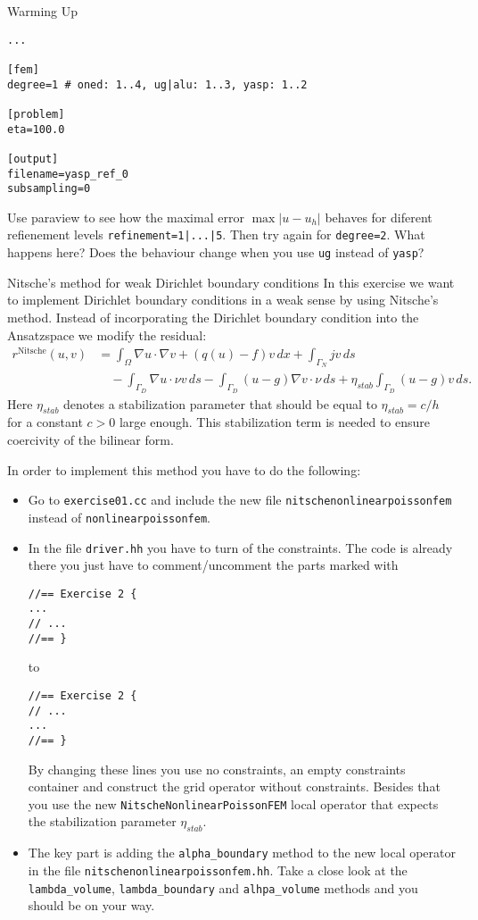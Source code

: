 \documentclass[12pt,a4paper]{article}
\begin{document}
\begin{Exercise}{Warming Up}
\begin{enumerate}
\begin{lstlisting}
...

[fem]
degree=1 # oned: 1..4, ug|alu: 1..3, yasp: 1..2

[problem]
eta=100.0

[output]
filename=yasp_ref_0
subsampling=0
    \end{lstlisting}
    Use paraview to see how the maximal error $\max|u-u_h|$ behaves
    for diferent refienement levels \lstinline{refinement=1|...|5}.
    Then try again for \lstinline{degree=2}.  What happens here?  Does
    the behaviour change when you use \lstinline{ug} instead of
    \lstinline{yasp}?
  \end{enumerate}
\end{Exercise}

\begin{Exercise}{Nitsche's method for weak Dirichlet boundary
    conditions}
  In this exercise we want to implement Dirichlet boundary conditions
  in a weak sense by using Nitsche's method.  Instead of
  incorporating the Dirichlet boundary condition into the Ansatzspace
  we modify the residual:
  \begin{align*}
    r^{\text{Nitsche}}(u,v) &= \int_\Omega \nabla u \cdot \nabla v + (q(u)-f)v\,dx + \int_{\Gamma_N} jv\,ds \\
    &\quad - \int_{\Gamma_D} \nabla u \cdot\nu v\,ds - \int_{\Gamma_D} (u-g)\nabla v \cdot\nu\,ds
    + \eta_{stab} \int_{\Gamma_D} (u-g)v\,ds.
  \end{align*}
  Here $\eta_{stab}$ denotes a stabilization parameter that should be
  equal to $\eta_{stab}=c/h$ for a constant $c>0$ large enough.  This
  stabilization term is needed to ensure coercivity of the bilinear
  form.

  In order to implement this method you have to do the following:
  \begin{itemize}
  \item Go to \lstinline{exercise01.cc} and include the new file
    \lstinline{nitschenonlinearpoissonfem} instead of
    \lstinline{nonlinearpoissonfem}.
  \item In the file \lstinline{driver.hh} you have to turn of the
    constraints.  The code is already there you just have to
    comment/uncomment the parts marked with
    \begin{lstlisting}
//== Exercise 2 {
...
// ...
//== }
    \end{lstlisting}
    to
    \begin{lstlisting}
//== Exercise 2 {
// ...
...
//== }
    \end{lstlisting}
    By changing these lines you use no constraints, an empty
    constraints container and construct the grid operator without
    constraints.  Besides that you use the new
    \lstinline{NitscheNonlinearPoissonFEM} local operator that expects
    the stabilization parameter $\eta_{stab}$.
  \item The key part is adding the \lstinline{alpha_boundary} method
    to the new local operator in the file
    \lstinline{nitschenonlinearpoissonfem.hh}.  Take a close look at
    the \lstinline{lambda_volume}, \lstinline{lambda_boundary} and
    \lstinline{alhpa_volume} methods and you should be on your way.


\end{itemize}
\end{Exercise}
\end{document}
